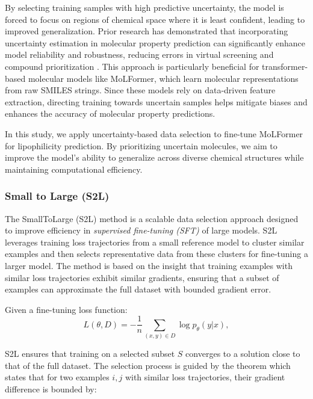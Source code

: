 \documentclass[11pt]{article}
\begin{document}
By selecting training samples with high predictive uncertainty, the model is forced to focus on regions of chemical space where it is least confident, leading to improved generalization. Prior research has demonstrated that incorporating uncertainty estimation in molecular property prediction can significantly enhance model reliability and robustness, reducing errors in virtual screening and compound prioritization \cite{nigam2021assigning}. This approach is particularly beneficial for transformer-based molecular models like MoLFormer, which learn molecular representations from raw SMILES strings. Since these models rely on data-driven feature extraction, directing training towards uncertain samples helps mitigate biases and enhances the accuracy of molecular property predictions.

In this study, we apply uncertainty-based data selection to fine-tune MoLFormer for lipophilicity prediction. By prioritizing uncertain molecules, we aim to improve the model’s ability to generalize across diverse chemical structures while maintaining computational efficiency.

\subsubsection{Small to Large (S2L)}
\label{Small to Large (S2L)}
The SmallToLarge (S2L) method is a scalable data selection approach designed to improve efficiency in \textit{supervised fine-tuning (SFT)} of large models. S2L leverages training loss trajectories from a small reference model to cluster similar examples and then selects representative data from these clusters for fine-tuning a larger model. The method is based on the insight that training examples with similar loss trajectories exhibit similar gradients, ensuring that a subset of examples can approximate the full dataset with bounded gradient error\cite{yang2023small}. 

Given a fine-tuning loss function:
\begin{equation}
    L(\theta, D) = - \frac{1}{n} \sum_{(x,y) \in D} \log p_{\theta}(y | x),
\end{equation}

S2L ensures that training on a selected subset \( S \) converges to a solution close to that of the full dataset. The selection process is guided by the theorem which states that for two examples \( i, j \) with similar loss trajectories, their gradient difference is bounded by\cite{yang2023small}:
\end{document}
